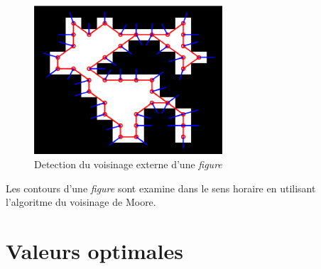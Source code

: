 \documentclass[twoside,openright,a4paper,11pt,french]{article}
\begin{document}
\begin{figure}[h]
\centering
\includegraphics[width=7cm]{./pics/moore.eps}
\caption{Detection du voisinage externe d'une {\it figure}}
\label{fig:moore}
\end{figure}

Les contours d'une {\it figure} sont examine dans le sens horaire en
utilisant l'algoritme du voisinage de Moore. 






\section{Valeurs optimales}
\end{document}
